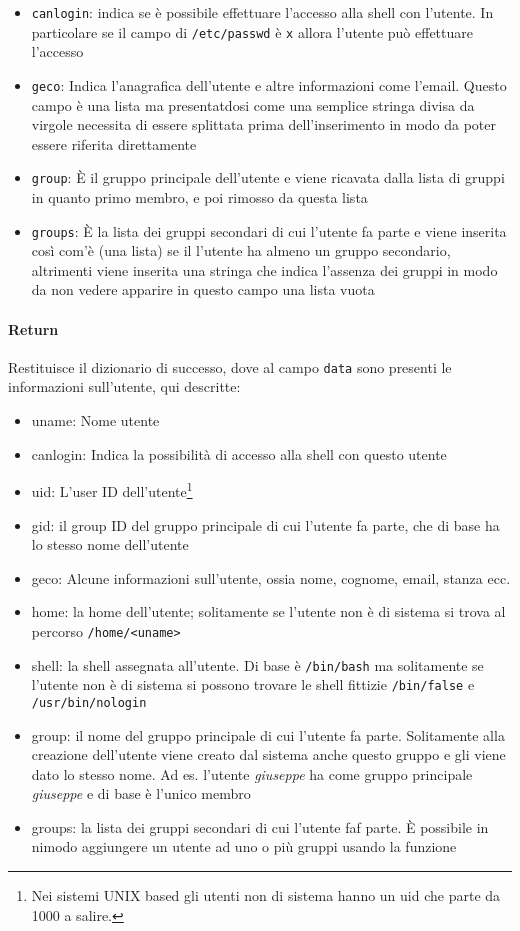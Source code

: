 \documentclass[11pt]{article}
\begin{document}
\begin{itemize}
	\item{\texttt{canlogin}: indica se è possibile effettuare l'accesso alla shell con l'utente.
		In particolare se il campo di \texttt{/etc/passwd} è \texttt{x} allora l'utente può effettuare l'accesso}
	\item{\texttt{geco}: Indica l'anagrafica dell'utente e altre informazioni come l'email. Questo campo è una lista
		ma presentatdosi come una semplice stringa divisa da virgole necessita di essere splittata prima dell'inserimento
		in modo da poter essere riferita direttamente}
	\item{\texttt{group}: È il gruppo principale dell'utente e viene ricavata dalla lista di gruppi in quanto primo membro,
		e poi rimosso da questa lista}
	\item{\texttt{groups}: È la lista dei gruppi secondari di cui l'utente fa parte e viene inserita così com'è (una lista)
		se il l'utente ha almeno un gruppo secondario, altrimenti viene inserita una stringa che indica l'assenza dei gruppi
		in modo da non vedere apparire in questo campo una lista vuota}
\end{itemize}
\paragraph{Return}
Restituisce il dizionario di successo, dove al campo \texttt{data} sono presenti le informazioni sull'utente, qui descritte:
\begin{itemize}
	\item{uname: Nome utente}
	\item{canlogin: Indica la possibilità di accesso alla shell con questo utente}
	\item{uid: L'user ID dell'utente\footnote{\label{uidusers}Nei sistemi UNIX based gli utenti non di sistema hanno un uid
		che parte da 1000 a salire.}}
	\item{gid: il group ID del gruppo principale di cui l'utente fa parte, che di base ha lo stesso nome dell'utente}
	\item{geco: Alcune informazioni sull'utente, ossia nome, cognome, email, stanza ecc.}
	\item{home: la home dell'utente; solitamente se l'utente non è di sistema si trova al percorso \texttt{/home/<uname>}}
	\item{shell: la shell assegnata all'utente. Di base è \texttt{/bin/bash} ma solitamente se l'utente non è di sistema
		si possono trovare le shell fittizie \texttt{/bin/false} e \texttt{/usr/bin/nologin}}
	\item{group: il nome del gruppo principale di cui l'utente fa parte. Solitamente alla creazione dell'utente viene creato
		dal sistema anche questo gruppo e gli viene dato lo stesso nome. Ad es. l'utente \textit{giuseppe} ha come
		gruppo principale \textit{giuseppe} e di base è l'unico membro}
	\item{groups: la lista dei gruppi secondari di cui l'utente faf parte. È possibile in nimodo aggiungere un utente ad uno
		o più gruppi usando la funzione }
\end{itemize}
\end{document}
